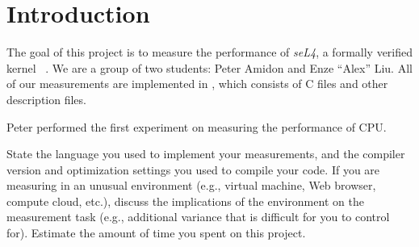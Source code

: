 \section{Introduction}
The goal of this project is to measure the performance of \textit{seL4},
a formally verified kernel ~\cite{klein2009sel4}. 
We are a group of two students: Peter Amidon and Enze ``Alex'' Liu. 
All of our measurements are implemented in , which consists of C files and other description files. 

Peter performed the first experiment on measuring the performance of CPU.

State the language you used to implement your measurements, 
and the compiler version and optimization settings you used to compile your code. 
If you are measuring in an unusual environment 
(e.g., virtual machine, Web browser, compute cloud, etc.), 
discuss the implications of the environment on the measurement task 
(e.g., additional variance that is difficult for you to control for). 
Estimate the amount of time you spent on this project.
